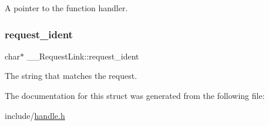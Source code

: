 A pointer to the function handler. 

\mbox{\label{struct_____request_link_ac6729255e75aaf3ad7a9f6f94d0e36e8}} 
\subsubsection{\texorpdfstring{request\+\_\+ident}{request\_ident}}
{\footnotesize\ttfamily char$\ast$ \+\_\+\+\_\+\+Request\+Link\+::request\+\_\+ident}



The string that matches the request. 



The documentation for this struct was generated from the following file\+:\begin{DoxyCompactItemize}
\item 
include/\mbox{\hyperlink{handle_8h}{handle.\+h}}\end{DoxyCompactItemize}

